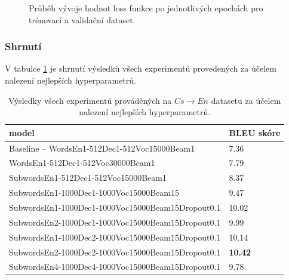 \begin{figure}[H]
    \begin{center}
    \end{center}
	\caption{Průběh vývoje hodnot loss funkce po jednotlivých epochách pro trénovací a validační dataset.}
\end{figure}

\subsubsection{Shrnutí}\label{experimentsSummary}
V tabulce \ref{table:experimentSummary} je shrnutí výsledků všech experimentů provedených za účelem nalezení nejlepších hyperparametrů.

\begin{table}[H]
    \begin{center}
        \begin{tabular}{ll}
          \toprule
          model & BLEU skóre\\
          \midrule
          Baseline -- WordsEn1-512Dec1-512Voc15000Beam1 & 7.36 \\
          WordsEn1-512Dec1-512Voc30000Beam1 & 7.79 \\
          SubwordsEn1-512Dec1-512Voc15000Beam1 & 8.37 \\
          SubwordsEn1-1000Dec1-1000Voc15000Beam15 & 9.47 \\
          SubwordsEn1-1000Dec1-1000Voc15000Beam15Dropout0.1 & 10.02 \\
          SubwordsEn2-1000Dec1-1000Voc15000Beam15Dropout0.1 & 9.99 \\
          SubwordsEn1-1000Dec2-1000Voc15000Beam15Dropout0.1 & 10.14 \\
          SubwordsEn2-1000Dec2-1000Voc15000Beam15Dropout0.1 & \textbf{10.42} \\
           SubwordsEn4-1000Dec4-1000Voc15000Beam15Dropout0.1 & 9.78 \\
          \bottomrule
        \end{tabular}
    \end{center}
	\caption{Výsledky všech experimentů prováděných na $Cs\rightarrow En$ datasetu za účelem nalezení nejlepších hyperparametrů.}
	\label{table:experimentSummary}
\end{table}


